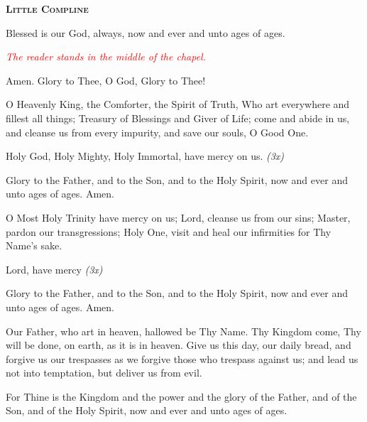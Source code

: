 

\begin{center}
\textsc{\textbf{Little Compline}}
\end{center}

\begin{hang}
\noindent{}Blessed is our God, always, now and ever 
and unto ages of ages.

\end{hang}

\noindent
\textcolor{red}{\textit{The reader stands in the middle of the chapel.}}

\begin{hang}
\noindent{}Amen.  Glory to Thee, O God, Glory to Thee!

O Heavenly King, the Comforter, the Spirit of Truth, Who art everywhere and 
fillest all things; Treasury of Blessings and Giver of Life; come and abide in 
us, and cleanse us from every impurity, and save our souls, O Good One.

Holy God, Holy Mighty, Holy Immortal, have mercy on us. \textit{(3x)}

Glory to the Father, and to the Son, and to the Holy Spirit, now and ever and 
unto ages of ages. Amen.

O Most Holy Trinity have mercy on us; Lord, cleanse us from our sins; Master, pardon our transgressions; Holy One, visit and heal our infirmities for Thy Name's sake.

Lord, have mercy \textit{(3x)}

Glory to the Father, and to the Son, and to the Holy Spirit, now and ever and 
unto ages of ages. Amen.

\end{hang}

\begin{hang}
\noindent{}Our Father, who art in heaven, hallowed be Thy 
Name.  Thy Kingdom come, Thy will be done, on earth, as it is in heaven.  Give 
us this day, our daily bread, and forgive us our trespasses as we forgive those 
who trespass against us; and lead us not into temptation, but deliver us from 
evil.

\end{hang}

\begin{hang}
\noindent{}For Thine is the Kingdom and the power and 
the glory of the Father, and of the Son, and of the Holy Spirit, now and ever 
and unto ages of ages.

\end{hang}

